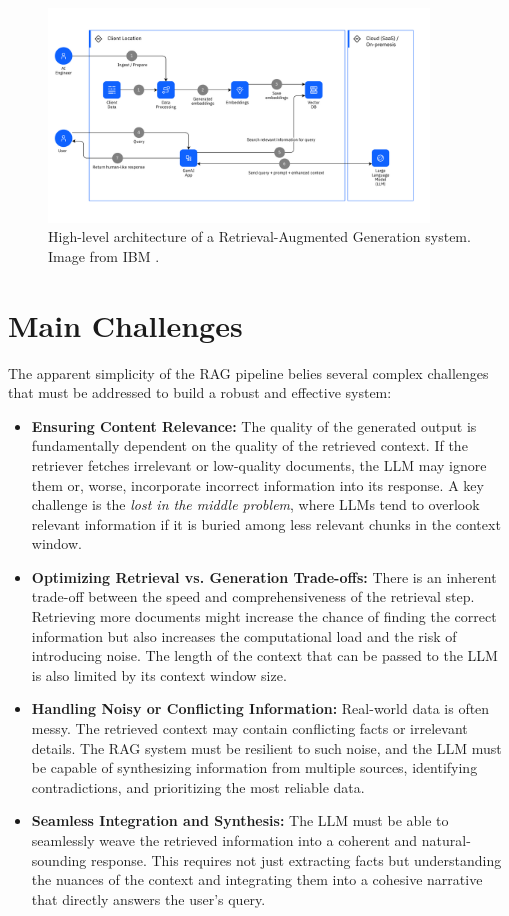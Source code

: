 \begin{figure}[h!]
    \centering
    \includegraphics[width=0.9\textwidth]{images/chapter2/rag_architecture.png}
    \caption{High-level architecture of a Retrieval-Augmented Generation system. Image from IBM \cite{ibm-rag-pattern}.}
    \label{fig:rag_architecture}
\end{figure}

\section{Main Challenges}
The apparent simplicity of the RAG pipeline belies several complex challenges that must be addressed to build a robust and effective system:
\begin{itemize}
    \item \textbf{Ensuring Content Relevance:} The quality of the generated output is fundamentally dependent on the quality of the retrieved context. If the retriever fetches irrelevant or low-quality documents, the LLM may ignore them or, worse, incorporate incorrect information into its response. A key challenge is the \textit{lost in the middle problem}, where LLMs tend to overlook relevant information if it is buried among less relevant chunks in the context window.
    \item \textbf{Optimizing Retrieval vs. Generation Trade-offs:} There is an inherent trade-off between the speed and comprehensiveness of the retrieval step. Retrieving more documents might increase the chance of finding the correct information but also increases the computational load and the risk of introducing noise. The length of the context that can be passed to the LLM is also limited by its context window size.
    \item \textbf{Handling Noisy or Conflicting Information:} Real-world data is often messy. The retrieved context may contain conflicting facts or irrelevant details. The RAG system must be resilient to such noise, and the LLM must be capable of synthesizing information from multiple sources, identifying contradictions, and prioritizing the most reliable data.
    \item \textbf{Seamless Integration and Synthesis:} The LLM must be able to seamlessly weave the retrieved information into a coherent and natural-sounding response. This requires not just extracting facts but understanding the nuances of the context and integrating them into a cohesive narrative that directly answers the user's query.
\end{itemize}

